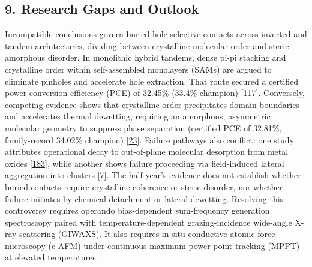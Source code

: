 \documentclass[
  11pt,
]{article}
\begin{document}
\subsection{9. Research Gaps and
Outlook}\label{research-gaps-and-outlook}

Incompatible conclusions govern buried hole-selective contacts across
inverted and tandem architectures, dividing between crystalline
molecular order and steric amorphous disorder. In monolithic hybrid
tandems, dense pi-pi stacking and crystalline order within
self-assembled monolayers (SAMs) are argued to eliminate pinholes and
accelerate hole extraction. That route secured a certified power
conversion efficiency (PCE) of 32.45\% (33.4\% champion)
{[}\href{https://doi.org/10.1038/s41467-026-72160-x}{117}{]}.
Conversely, competing evidence shows that crystalline order precipitates
domain boundaries and accelerates thermal dewetting, requiring an
amorphous, asymmetric molecular geometry to suppress phase separation
(certified PCE of 32.81\%, family-record 34.02\% champion)
{[}\href{https://doi.org/10.1002/adma.73106}{23}{]}. Failure pathways
also conflict: one study attributes operational decay to out-of-plane
molecular desorption from metal oxides
{[}\href{https://doi.org/10.1016/j.scib.2026.02.050}{183}{]}, while
another shows failure proceeding via field-induced lateral aggregation
into clusters
{[}\href{https://doi.org/10.1038/s41467-026-72097-1}{7}{]}. The half
year's evidence does not establish whether buried contacts require
crystalline coherence or steric disorder, nor whether failure initiates
by chemical detachment or lateral dewetting. Resolving this controversy
requires operando bias-dependent sum-frequency generation spectroscopy
paired with temperature-dependent grazing-incidence wide-angle X-ray
scattering (GIWAXS). It also requires in situ conductive atomic force
microscopy (c-AFM) under continuous maximum power point tracking (MPPT)
at elevated temperatures.
\end{document}
